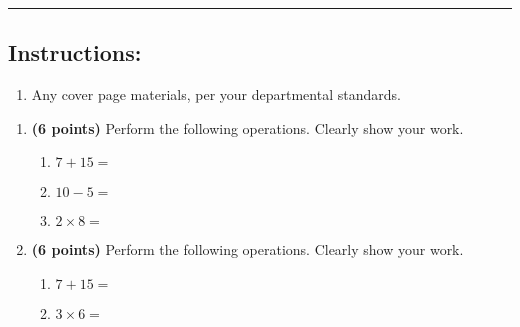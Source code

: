 \documentclass[12pt]{amsart}
\begin{document}
\vspace{.4cm}


\vspace{.4cm}

\hrule

\subsection*{Instructions:} \begin{enumerate}[1.]
\item Any cover page materials, per your departmental standards.
\end{enumerate}


\newpage
\begin{enumerate}
\item {\bf (6 points)} 
 Perform the following operations. Clearly show your work. \begin{enumerate}


\def \a{7}\def \b{15}\def \apb{22}

 
\item $\a + \b = $

\vspace{2cm}
\def \a{10}\def \dif{5}\def \b{5}

 
\item $\a - \b = $

\vspace{2cm}
\def \a{2}\def \b{8}\def \ab{10}

 
\item $\a \times \b = $ 

\vspace{2cm}
\def \vshift{3}\def \hshift{4}\def \chang{1}\def \findval{5}\def \yval{1}

 
\end{enumerate}


\newpage
\item {\bf (6 points)} 
 Perform the following operations. Clearly show your work. \begin{enumerate}


\def \a{7}\def \b{15}\def \apb{22}

 
\item $\a + \b = $

\vspace{2cm}
\def \a{3}\def \b{6}\def \ab{9}

 
\item $\a \times \b = $ 

\vspace{2cm}
\def \vshift{1}\def \hshift{2}\def \chang{2}\def \findval{4}\def \yval{-3}

 
\end{enumerate}


\newpage\end{enumerate}\graphicspath{{C:/Users/iainc/anaconda3/Randomizer/Sample Course/Sample Assessment 2/}}\setcounter{page}{1}
\end{document}
